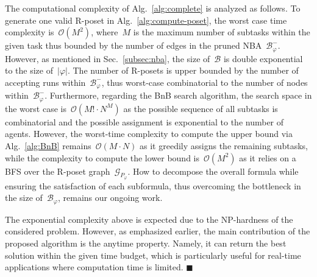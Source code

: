 The computational complexity of Alg.~\ref{alg:complete}
is analyzed as follows. To generate one valid R-poset in Alg.~\ref{alg:compute-poset},
the worst case time complexity is~$\mathcal{O}(M^2)$, where~$M$ is the maximum
number of subtasks within the given task thus bounded by the number of edges in the
pruned NBA~$\mathcal{B}^-_{\varphi}$.
However, as mentioned in Sec.~\ref{subsec:nba},
the size of~$\mathcal{B}$ is double exponential to the size of~$|\varphi|$.
The number of R-posets is upper bounded by the number of accepting runs
within~$\mathcal{B}^-_{\varphi}$, thus worst-case combinatorial to
the number of nodes within~$\mathcal{B}^-_{\varphi}$.
Furthermore, regarding the BnB search algorithm, the search space in the worst
case is~$\mathcal{O}(M!\cdot N^M)$ as the possible sequence of all subtasks
is combinatorial and the possible assignment is exponential to the
number of agents.
However, the worst-time complexity to compute the upper bound via Alg.~\ref{alg:BnB}
remains~$\mathcal{O}(M\cdot N)$ as it greedily assigns the remaining subtasks,
while the complexity to compute the lower bound is~$\mathcal{O}(M^2)$ as it relies on a BFS over
the R-poset graph~$\mathcal{G}_{P_\varphi}$.
How to decompose the overall formula while ensuring
the satisfaction of each subformula, thus overcoming the bottleneck
in the size of~$\mathcal{B}_{\varphi}$, remains our ongoing work.

\begin{remark}\label{remark:anytime}
The exponential complexity above is expected due to the NP-hardness of the considered problem.
However, as emphasized earlier, the main contribution of the proposed algorithm
is the anytime property.
Namely, it can return the best solution within the given time budget,
which is particularly useful for real-time applications where computation time is limited.
\hfill  $\blacksquare$
\end{remark}
